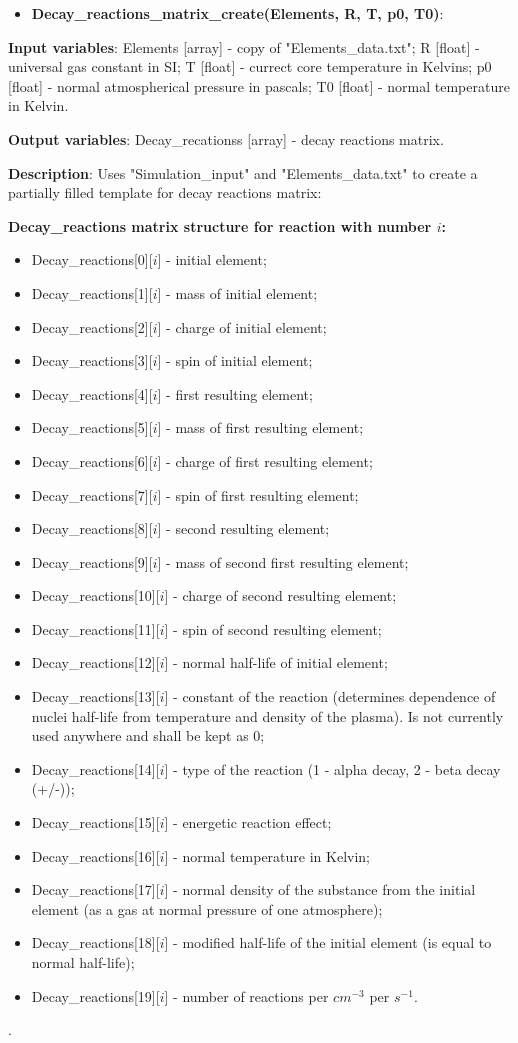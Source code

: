 \documentclass[a4paper,12pt]{article}
\newcommand{\namefunction}[4]{
  \begin{itemize}
    \item \textbf{#1}:
  \end{itemize}
  
  \textbf{Input variables}: #2.
  
  \textbf{Output variables}: #4.
  
  \textbf{Description}: #3.
}
\begin{document}
\namefunction{Decay\_reactions\_matrix\_create(Elements, R, T, p0, T0)}{Elements [array] - copy of "Elements\_data.txt"; R [float] - universal gas constant in SI; T [float] - currect core temperature in Kelvins; p0 [float] - normal atmospherical pressure in pascals; T0 [float] - normal temperature in Kelvin}{Uses "Simulation\_input" and "Elements\_data.txt" to create a partially filled template for decay reactions matrix:

\textbf{Decay\_reactions matrix structure for reaction with number $i$:}
\begin{itemize}
	\item Decay\_reactions[0][$i$] - initial element;
	\item Decay\_reactions[1][$i$] - mass of initial element;
	\item Decay\_reactions[2][$i$] - charge of initial element;
	\item Decay\_reactions[3][$i$] - spin of initial element;
	\item Decay\_reactions[4][$i$] - first resulting element;
	\item Decay\_reactions[5][$i$] - mass of first resulting element;
	\item Decay\_reactions[6][$i$] - charge of first resulting element;
	\item Decay\_reactions[7][$i$] - spin of first resulting element;
	\item Decay\_reactions[8][$i$] - second resulting element;
	\item Decay\_reactions[9][$i$] - mass of second first resulting element;
	\item Decay\_reactions[10][$i$] - charge of second resulting element;
	\item Decay\_reactions[11][$i$] - spin of second resulting element;
	\item Decay\_reactions[12][$i$] - normal half-life of initial element;	
	\item Decay\_reactions[13][$i$] - constant of the reaction (determines dependence of nuclei half-life from temperature and density of the plasma). Is not currently used anywhere and shall be kept as 0;
	\item Decay\_reactions[14][$i$] - type of the reaction (1 - alpha decay, 2 - beta decay (+/-));
	\item Decay\_reactions[15][$i$] - energetic reaction effect;
	\item Decay\_reactions[16][$i$] - normal temperature in Kelvin;
	\item Decay\_reactions[17][$i$] - normal density of the substance from the initial element (as a gas at normal pressure of one atmosphere);
	\item Decay\_reactions[18][$i$] - modified half-life of the initial element (is equal to normal half-life);
	\item Decay\_reactions[19][$i$] - number of reactions per $cm^{-3}$ per $s^{-1}$.
\end{itemize}

}{Decay\_recationss [array] - decay reactions matrix}
\end{document}
